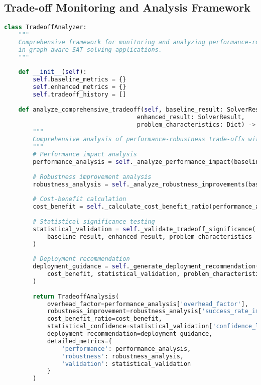 \subsection{Trade-off Monitoring and Analysis Framework}
\label{appendix:tradeoff-monitoring}

\begin{lstlisting}[language=Python, caption=Trade-off Monitoring and Analysis Framework]
class TradeoffAnalyzer:
    """
    Comprehensive framework for monitoring and analyzing performance-robustness trade-offs
    in graph-aware SAT solving applications.
    """
    
    def __init__(self):
        self.baseline_metrics = {}
        self.enhanced_metrics = {}
        self.tradeoff_history = []
        
    def analyze_comprehensive_tradeoff(self, baseline_result: SolverResult, 
                                     enhanced_result: SolverResult, 
                                     problem_characteristics: Dict) -> TradeoffAnalysis:
        """
        Comprehensive analysis of performance-robustness trade-offs with statistical validation.
        """
        # Performance impact analysis
        performance_analysis = self._analyze_performance_impact(baseline_result, enhanced_result)
        
        # Robustness improvement analysis
        robustness_analysis = self._analyze_robustness_improvements(baseline_result, enhanced_result)
        
        # Cost-benefit calculation
        cost_benefit = self._calculate_cost_benefit_ratio(performance_analysis, robustness_analysis)
        
        # Statistical significance testing
        statistical_validation = self._validate_tradeoff_significance(
            baseline_result, enhanced_result, problem_characteristics
        )
        
        # Deployment recommendation
        deployment_guidance = self._generate_deployment_recommendation(
            cost_benefit, statistical_validation, problem_characteristics
        )
        
        return TradeoffAnalysis(
            overhead_factor=performance_analysis['overhead_factor'],
            robustness_improvement=robustness_analysis['success_rate_improvement'],
            cost_benefit_ratio=cost_benefit,
            statistical_confidence=statistical_validation['confidence_level'],
            deployment_recommendation=deployment_guidance,
            detailed_metrics={
                'performance': performance_analysis,
                'robustness': robustness_analysis,
                'validation': statistical_validation
            }
        )
    

\end{lstlisting}
